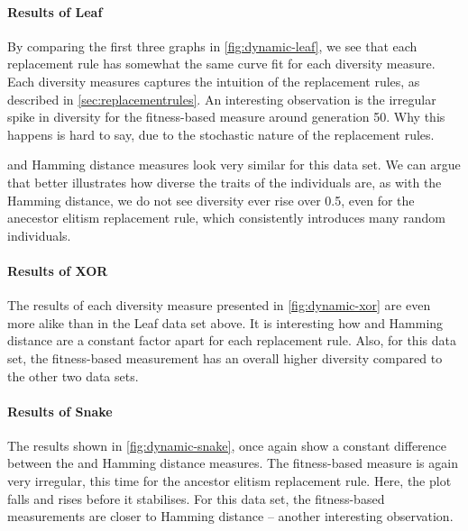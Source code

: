 \paragraph{Results of Leaf} By comparing the first three graphs in \cref{fig:dynamic-leaf}, we see that each replacement rule has somewhat the same curve fit for each diversity measure. Each diversity measures captures the intuition of the replacement rules, as described in \cref{sec:replacementrules}. An interesting observation is the irregular spike in diversity for the fitness-based measure around generation \num{50}. Why this happens is hard to say, due to the stochastic nature of the replacement rules.

\dia{} and Hamming distance measures look very similar for this data set. We can argue that \dia{} better illustrates how diverse the traits of the individuals are, as with the Hamming distance, we do not see diversity ever rise over \num{0.5}, even for the anecestor elitism replacement rule, which consistently introduces many random individuals. 



\paragraph{Results of XOR} The results of each diversity measure presented in \cref{fig:dynamic-xor} are even more alike than in the Leaf data set above. It is interesting how \dia{} and Hamming distance are a constant factor apart for each replacement rule.  Also, for this data set, the fitness-based measurement has an overall higher diversity compared to the other two data sets.%



\paragraph{Results of Snake} The results shown in \cref{fig:dynamic-snake}, once again show a constant difference between the \dia{} and Hamming distance measures. The fitness-based measure is again very irregular, this time for the ancestor elitism replacement rule. Here, the plot falls and rises before it stabilises. For this data set, the fitness-based measurements are closer to Hamming distance -- another interesting observation.

